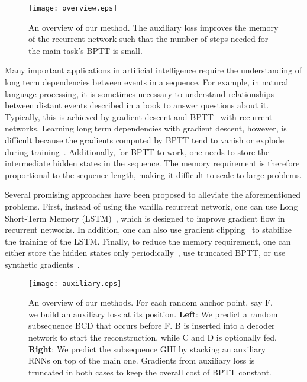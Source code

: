 \documentclass{article}
\begin{document}
\begin{figure}[t!]
\centering
\texttt{[image: overview.eps]}
\caption{An overview of our method. The auxiliary loss improves the memory of the recurrent network such that the number of steps needed for the main task's BPTT is small.}
\label{fig:overview}
\end{figure}
Many important applications in artificial intelligence require the understanding of long term dependencies between events in a sequence. For example, in natural language processing, it is sometimes necessary to understand relationships between distant events described in a book to answer questions about it. Typically, this is achieved by gradient descent and BPTT~\cite{Rumelhart86} with recurrent networks. Learning long term dependencies with gradient descent, however, is difficult because the gradients computed by BPTT tend to vanish or explode during training~\cite{hochreiter2001gradient}. Additionally, for BPTT to work, one needs to store the intermediate hidden states in the sequence. The memory requirement is therefore proportional to the sequence length, making it difficult to scale to large problems.

Several promising approaches have been proposed to alleviate the aforementioned problems. First, instead of using the vanilla recurrent network, one can use Long Short-Term Memory (LSTM)~\cite{hochreiter1997long}, which is designed to improve gradient flow in recurrent networks. In addition, one can also use gradient clipping~\cite{pascanu2013difficulty} to stabilize the training of the LSTM. Finally, to reduce the memory requirement, one can either store the hidden states only periodically~\cite{gruslys2016memory, chen2016training}, use truncated BPTT, or use synthetic gradients~\cite{Jaderberg16synthGrad}. 


\begin{figure*}[tb]
\centering
\texttt{[image: auxiliary.eps]}
\caption{An overview of our methods. For each random anchor point, say F, we build an auxiliary loss at its position. \textbf{Left}: We predict a random subsequence BCD that occurs before F. B is inserted into a decoder network to start the reconstruction, while C and D is optionally fed. \textbf{Right}: We predict the subsequence GHI by stacking an auxiliary RNNs on top of the main one. Gradients from auxiliary loss is truncated in both cases to keep the overall cost of BPTT constant.}
\label{fig:method}
\end{figure*}
\end{document}
